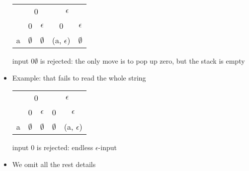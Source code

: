 \begin{frame}[allowframebreaks]
\begin{itemize}
  \begin{center}
  \begin{tabular}{c|cccc}
    & \multicolumn{2}{c}{0} & \multicolumn{2}{c}{$\epsilon$}\\
& 0 & $\epsilon$ & 0 & $\epsilon$ \\ \hline
a & $\emptyset$ & $\emptyset$ & (a, $\epsilon$) & $\emptyset$
  \end{tabular}
\end{center}

input 0$\emptyset$ is rejected: the only move is to pop up
zero, but the stack is empty

\item Example: that fails to read the whole string

  \begin{center}
  \begin{tabular}{c|cccc}
    & \multicolumn{2}{c}{0} & \multicolumn{2}{c}{$\epsilon$}\\
& 0 & $\epsilon$ & 0 & $\epsilon$
\\ \hline
a & $\emptyset$ & $\emptyset$ & $\emptyset$& (a, $\epsilon$)
  \end{tabular}
\end{center}
input 0 is rejected: endless $\epsilon$-input

\item We omit all the rest details

\end{itemize}\end{frame}


